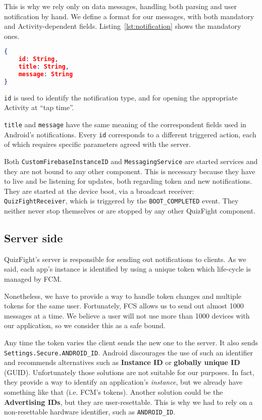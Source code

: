This is why we rely only on data messages, handling both parsing and user
notification by hand.
We define a format for our messages, with both mandatory and Activity-dependent
fields. Listing~\ref{lst:notification} shows the mandatory ones.

\begin{lstlisting}[language=json, caption={Mandatory fields for a notification}, label={lst:notification}]
{
	id: String,
	title: String,
	message: String
}
\end{lstlisting}

\texttt{id} is used to identify the notification type, and for opening the
appropriate Activity at ``tap time''.

\texttt{title} and \texttt{message} have the same meaning of the correspondent
fields used in Android's notifications.
Every \texttt{id} corresponds to a different triggered action, each of which
requires specific parameters agreed with the server.

Both \texttt{CustomFirebaseInstanceID} and \texttt{MessagingService} are
started services and they are not bound to any other component.
This is necessary because they have to live and be listening for updates,
both regarding token and new notifications.
They are started at the device boot, via a broadcast receiver: 
\texttt{QuizFightReceiver}, which is triggered by the \texttt{BOOT\_COMPLETED}
event.
They neither never stop themselves or are stopped by any other QuizFight
component. 

\subsection{Server side}
QuizFight's server is responsible for sending out notifications to clients.
As we said, each app's instance is identified by using a unique token which
life-cycle is managed by FCM.

Nonetheless, we have to provide a way to handle token changes and multiple
tokens for the same user. Fortunately, FCS allows us to send out almost 1000
messages at a time.
We believe a user will not use more than 1000 devices with our application,
so we consider this as a safe bound.

Any time the token varies the client sends the new one to the server.
It also sends \texttt{Settings.Secure.ANDROID\_ID}.
Android discourages the use of such an identifier and recommends
alternatives such as \textbf{Instance ID} or \textbf{globally unique ID} (GUID).
Unfortunately those solutions are not suitable for our purposes.
In fact, they provide a way to identify an application's \textit{instance}, but
we already have something like that (i.e. FCM's tokens).
Another solution could be the \textbf{Advertising IDs}, but they are
user-resettable.
This is why we had to rely on a non-resettable hardware identifier, such as
\texttt{ANDROID\_ID}.

